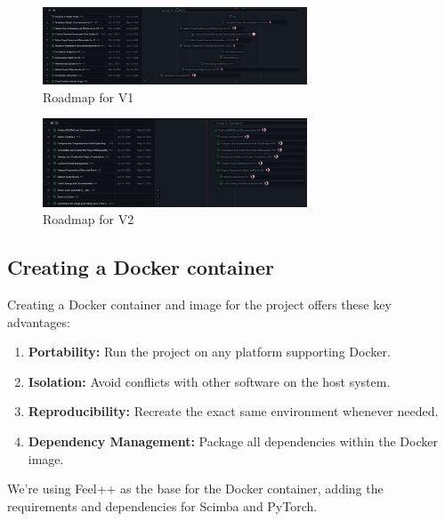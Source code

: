 \documentclass[12pt]{article}
\begin{document}
\begin{figure}[H]
    \centering
    \includegraphics[width=0.7\textwidth]{images/roadmapV1.png}
    \caption{Roadmap for V1}
\end{figure}

\begin{figure}[H]
    \centering
    \includegraphics[width=0.7\textwidth]{images/roadmapV2.png}
    \caption{Roadmap for V2}
\end{figure}

\newpage 

\subsection{Creating a Docker container}
Creating a Docker container and image for the project offers these key advantages:

\begin{enumerate}
    \item \textbf{Portability:} Run the project on any platform supporting Docker.
    \item \textbf{Isolation:} Avoid conflicts with other software on the host system.
    \item \textbf{Reproducibility:} Recreate the exact same environment whenever needed.
    \item \textbf{Dependency Management:} Package all dependencies within the Docker image.
    \\
\end{enumerate}


We're using Feel++ as the base for the Docker container, adding the requirements and dependencies for Scimba and PyTorch.
\end{document}
